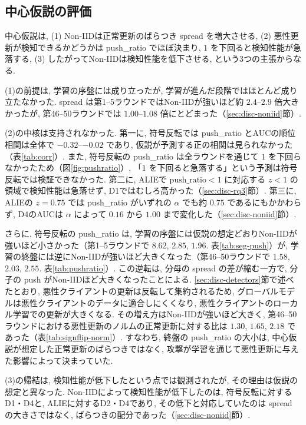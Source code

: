 \documentclass[a4j, twocolumn, dvipdfmx]{jsarticle}
\newcommand{\PushRatio}{\textrm{push\_ratio}}
\newcommand{\Spread}{\textrm{spread}}
\newcommand{\Push}{\textrm{push}}
\begin{document}
\subsection{中心仮説の評価}
\label{sec:disc-hyp}

中心仮説は, (1) Non-IIDは正常更新のばらつき \Spread{} を増大させる, (2) 悪性更新が検知できるかどうかは \PushRatio{} でほぼ決まり, $1$ を下回ると検知性能が急落する, (3) したがってNon-IIDは検知性能を低下させる, という3つの主張からなる.

(1)の前提は, 学習の序盤には成り立ったが, 学習が進んだ段階ではほとんど成り立たなかった. \Spread{} は第1--5ラウンドではNon-IIDが強いほど約 $2.4$--$2.9$ 倍大きかったが, 第46--50ラウンドでは $1.00$--$1.08$ 倍にとどまった（\ref{sec:disc-noniid}節）.

(2)の中核は支持されなかった. 第一に, 符号反転では \PushRatio{} とAUCの順位相関は全体で $-0.32$--$-0.02$ であり, 仮説が予測する正の相関は見られなかった（表\ref{tab:corr}）. また, 符号反転の \PushRatio{} は全ラウンドを通じて $1$ を下回らなかったため（図\ref{fig:pushratio}）, 「$1$ を下回ると急落する」という予測は符号反転では検証できなかった. 第二に, ALIEで $\PushRatio<1$ に対応する $z<1$ の領域で検知性能は急落せず, D1ではむしろ高かった（\ref{sec:disc-rq3}節）. 第三に, ALIEの $z=0.75$ では \PushRatio{} がいずれの $\alpha$ でも約 $0.75$ であるにもかかわらず, D4のAUCは $\alpha$ によって $0.16$ から $1.00$ まで変化した（\ref{sec:disc-noniid}節）.

さらに, 符号反転の \PushRatio{} は, 学習の序盤には仮説の想定どおりNon-IIDが強いほど小さかった（第1--5ラウンドで $8.62$, $2.85$, $1.96$. 表\ref{tab:seg-push}）が, 学習の終盤には逆にNon-IIDが強いほど大きくなった（第46--50ラウンドで $1.58$, $2.03$, $2.55$. 表\ref{tab:pushratio}）. この逆転は, 分母の \Spread{} の差が縮む一方で, 分子の \Push{} がNon-IIDほど大きくなったことによる. \ref{sec:disc-detectors}節で述べたとおり, 悪性クライアントの更新は反転して集約されるため, グローバルモデルは悪性クライアントのデータに適合しにくくなり, 悪性クライアントのローカル学習での更新が大きくなる. その増え方はNon-IIDが強いほど大きく, 第46--50ラウンドにおける悪性更新のノルムの正常更新に対する比は $1.30$, $1.65$, $2.18$ であった（表\ref{tab:signflip-norm}）. すなわち, 終盤の \PushRatio{} の大小は, 中心仮説が想定した正常更新のばらつきではなく, 攻撃が学習を通じて悪性更新に与えた影響によって決まっていた.

(3)の帰結は, 検知性能が低下したという点では観測されたが, その理由は仮説の想定と異なった. Non-IIDによって検知性能が低下したのは, 符号反転に対するD1・D4と, ALIEに対するD2・D4であり, その低下と対応していたのは \Spread{} の大きさではなく, ばらつきの配分であった（\ref{sec:disc-noniid}節）.
\end{document}
